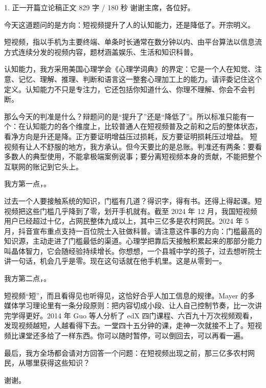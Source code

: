 \documentclass[script,pro]{debate}
\begin{document}
\debatetitle
\begin{speech}{1. 正一开篇立论稿}{正文 829 字 / 180 秒}
谢谢主席，各位好。

今天这道题问的是方向：短视频提升了人的认知能力，还是降低了。开宗明义。

短视频，指以手机为主要终端、单条时长通常在数分钟以内、由平台算法以信息流方式连续分发的视频内容，题材涵盖娱乐、生活和知识科普。

认知能力，我方采用美国心理学会《心理学词典》的界定：它是一个人在知觉、注意、记忆、理解、推理、判断和语言这一整套心理加工上的能力。请评委记住这个定义。认知能力不只是专注力，它还包括你知道什么、你理不理解、你会不会判断。

那么今天的判准是什么？辩题问的是“提升了”还是“降低了”。所以标准只能有一个：在认知能力的各个维度上，比较普通人在短视频普及之前和之后的整体状态，看净方向是升还是降。正方要证明增益压过损耗，反方要证明损耗压过增益。 短视频有让人不舒服的地方，我方承认。但今天要比的是总账。判准还有两条：要看多数人的典型使用，不能拿极端案例说事；要分离短视频本身的贡献，不能把整个互联网的账记到它头上。

我方第一点，。

过去一个人要接触系统的知识，门槛有几道？得识字，得有书。还得上得起课。短视频把这些门槛几乎降到了零，划开手机就有。截至 2024 年 12 月，我国短视频用户已经超过十亿，占网民整体九成以上，其中三亿多是农村网民。2024 年 5 月，抖音宣布重点支持一百位院士入驻做科普。请注意这件事的方向：门槛最高的知识源，主动走进了门槛最低的渠道。心理学把靠后天接触积累起来的那部分能力叫晶体智力，它会随经验持续增长。你想想，一个县城中学的孩子，过去想听院士讲一句话，机会几乎是零。现在这句话就在他手机里。这是从零到一。

我方第二点，。

短视频“短”，而且看得见也听得见，这恰好合乎人加工信息的规律。Mayer 的多媒体学习理论里有一条分段原则：把内容切成小段、让人自己控制节奏，比一次讲完学得更好。2014 年 Guo 等人分析了 edX 四门课程、六百九十万次视频观看，发现视频越短，人越看得下去。一堂四十五分钟的课，走神一次就接不上了。短视频比课堂还多给了一样东西。你可以随时暂停，可以倒回去，可以再看一遍。

最后，我方全场都会请对方回答一个问题：在短视频出现之前，那三亿多农村网民，从哪里获得这些知识？

谢谢。

\begin{contingency}
\end{contingency}
\end{speech}
\end{document}
